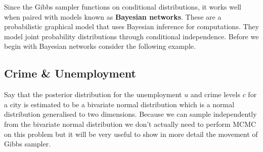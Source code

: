 \documentclass[12pt,twoside]{report}   %
\newcommand{\bb}{\textbf}
\begin{document}
Since the Gibbs sampler functions on conditional distributions, it works well when paired with models known as \bb{Bayesian networks}. These are a probabilistic graphical model that uses Bayesian inference for computations. They model joint probability distributions through conditional independence. Before we begin with Bayesian networks consider the following example.

\subsection{Crime \& Unemployment}\label{Crime Example}
\vspace{-0.35in}
\underline{\hspace{6.2in}}
\vspace{-0.1in}

Say that the posterior distribution for the unemployment $u$ and crime levels $c$ for a city is estimated to be a bivariate normal distribution which is a normal distribution generalised to two dimensions. Because we can sample independently from the bivariate normal distribution we don't actually need to perform MCMC on this problem but it will be very useful to show in more detail the movement of Gibbs sampler. 
\end{document}
